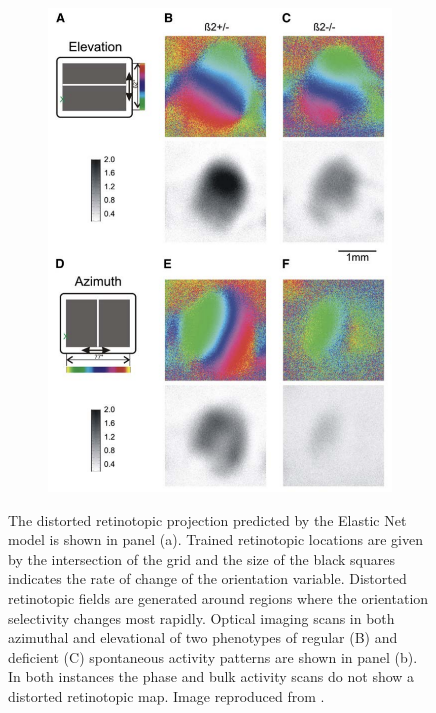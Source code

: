 \begin{figure}
\begin{subfigure}{0.4\textwidth}
		\includegraphics[width=\textwidth]{images/introduction/V1retinotopy}
		\caption{}
	\end{subfigure}
	\caption{The distorted retinotopic projection predicted by the Elastic Net model is shown in panel (a).  Trained retinotopic locations are given by the intersection of the grid and the size of the black squares indicates the rate of change of the orientation variable. Distorted retinotopic fields are generated around regions where the orientation selectivity changes most rapidly. Optical imaging scans in both azimuthal and elevational of two phenotypes of regular (B) and deficient (C) spontaneous activity patterns are shown in panel (b). In both instances the phase and bulk activity scans do not show a distorted retinotopic map. Image reproduced from \cite{Cang2005-eg}. }
\end{figure}
